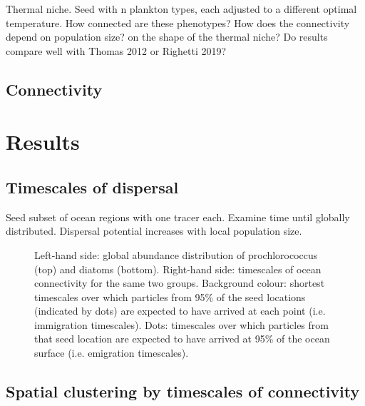\documentclass[12pt]{article}
\begin{document}
Thermal niche. Seed with n plankton types, each adjusted to a different optimal temperature. How connected are these phenotypes? How does the connectivity depend on population size? on the shape of the thermal niche? Do results compare well with Thomas 2012 or Righetti 2019?







\subsection{Connectivity}






\section{Results}

\subsection{Timescales of dispersal}

Seed subset of ocean regions with one tracer each. Examine time until globally distributed. Dispersal potential increases with local population size.


\begin{figure}[htp!]

\caption{Left-hand side: global abundance distribution of prochlorococcus (top) and diatoms (bottom). Right-hand side: timescales of ocean connectivity for the same two groups. Background colour: shortest timescales over which particles from 95\% of the seed locations (indicated by dots) are expected to have arrived at each point (i.e. immigration timescales). Dots: timescales over which particles from that seed location are expected to have arrived at 95\% of the ocean surface (i.e. emigration timescales).}
\label{connectivity_90_prctile}
\end{figure}



\subsection{Spatial clustering by timescales of connectivity}
\end{document}
